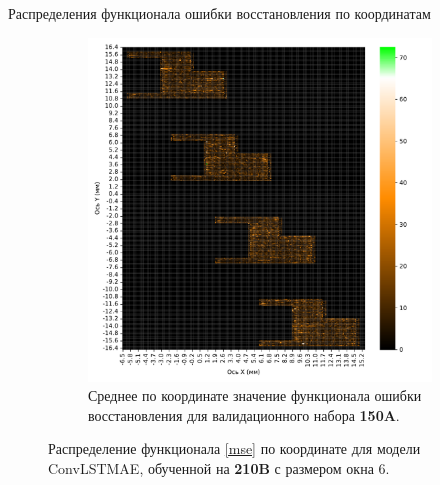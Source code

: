 \documentclass{article}
\begin{document}
\begin{subsection}{Распределения функционала ошибки восстановления по координатам \label{app:distrs}}
\begin{figure}[H]
\begin{subfigure}{.47\textwidth}
            \includegraphics[scale=.3]{lstm_2_window_xy_test.pdf}
            \caption{Среднее по координате значение функционала ошибки восстановления для валидационного набора \textbf{150A}.}\label{lstm_2_window_xy_train}
        \end{subfigure}
        \caption{Распределение функционала \eqref{mse} по координате для модели ConvLSTMAE, обученной на \textbf{210B} с размером окна 6.}\label{lstm_xy_6}
    \end{figure}
\end{subsection}
\end{document}
